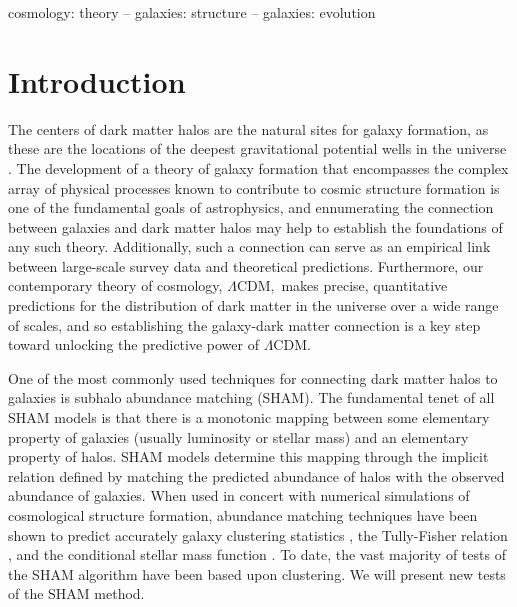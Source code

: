 \documentclass[usenatbib,usegraphicx,letterpaper]{mn2e}
\newcommand{\lcdm}{\Lambda\mathrm{CDM}}
\begin{document}
\begin{keywords}
{cosmology: theory -- galaxies: structure -- galaxies: evolution}
\end{keywords}

\maketitle

\section{Introduction}
\label{section:introduction} 

The centers of dark matter halos are the natural sites for galaxy
formation, as these are the locations of the deepest gravitational
potential wells in the universe \cite[e.g.,][]{white_rees78}. 
The development of a theory of galaxy
formation that encompasses the complex array of physical processes
known to contribute to cosmic structure formation is one of the
fundamental goals of astrophysics, and ennumerating the connection between 
galaxies and dark matter halos may help to establish the foundations of any 
such theory. Additionally, such a connection can serve as 
an empirical link between large-scale survey data and theoretical 
predictions.  Furthermore, our contemporary theory of cosmology, $\lcdm,$
makes precise, quantitative predictions for the distribution of dark
matter in the universe over a wide range of scales, and so establishing 
the galaxy-dark matter connection is a key step toward unlocking the
predictive power of $\lcdm.$

One of the most commonly used techniques for connecting dark matter
halos to galaxies is subhalo abundance matching (SHAM). The
fundamental tenet of all SHAM models is that there is a monotonic
mapping between some elementary property of galaxies (usually
luminosity or stellar mass) and an elementary property of halos. SHAM
models determine this mapping through the implicit relation defined by
matching the predicted abundance of halos with the observed abundance
of galaxies. When used in concert with numerical simulations of
cosmological structure formation, abundance matching techniques have
been shown to predict accurately galaxy clustering statistics
\citep{kravtsov_etal04,tasitsiomi_etal04,conroy_etal06,behroozi_etal10,moster_etal10},
the Tully-Fisher relation \citep{trujillo-gomez_etal11}, and the
conditional stellar mass function \citep{reddick_etal12}.  
To date, the vast majority of tests of the SHAM algorithm have 
been based upon clustering.  We will present new tests of the 
SHAM method.
\end{document}
